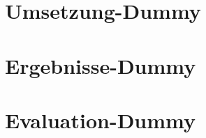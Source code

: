 
\chapter{Umsetzung-Dummy}

\renewcommand{\kapitelautor}{Autor: Blindtext}

\Blindtext


\chapter{Ergebnisse-Dummy}

\renewcommand{\kapitelautor}{Autor: Susi Sorglos}

\blindmathpaper\Blindtext


\chapter{Evaluation-Dummy}

\renewcommand{\kapitelautor}{Autor: Blindtext}

\Blindtext

\Blinddocument\Blindtext\Blinddocument[2]\Blindtext\Blinddocument[5]\Blindtext\Blinddocument[10]\Blindtext\Blindtext

\renewcommand{\kapitelautor}{}
